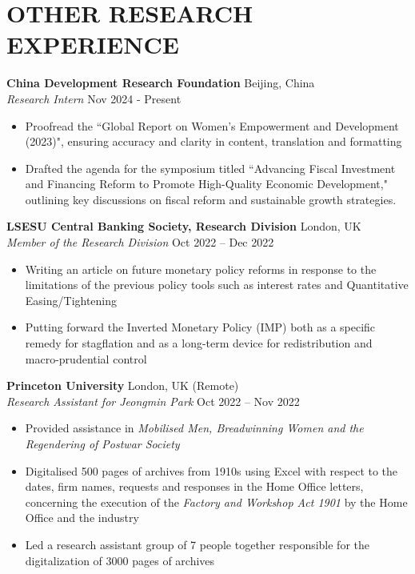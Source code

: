\documentclass[a4paper,9pt]{extarticle}
\begin{document}
\section*{OTHER RESEARCH EXPERIENCE}
\noindent
\textbf{China Development Research Foundation} \hfill Beijing, China \\
\textit{Research Intern} \hfill Nov 2024 - Present
\begin{itemize}
    \item Proofread the ``Global Report on Women's Empowerment and Development (2023)", ensuring accuracy and clarity in content, translation and formatting
    \item Drafted the agenda for the symposium titled ``Advancing Fiscal Investment and Financing Reform to Promote High-Quality Economic Development," outlining key discussions on fiscal reform and sustainable growth strategies.
\end{itemize}
\noindent
\textbf{LSESU Central Banking Society, Research Division} \hfill London, UK\\ %
\textit{Member of the Research Division} \hfill Oct 2022 – Dec 2022 %
\begin{itemize}
    \item Writing an article on future monetary policy reforms in response to the limitations of the previous policy tools such as interest rates and Quantitative Easing/Tightening
    \item Putting forward the Inverted Monetary Policy (IMP) both as a specific remedy for stagflation and as a long-term device  for redistribution and macro-prudential control
\end{itemize}
\noindent
\textbf{Princeton University} \hfill London, UK (Remote) \\
\textit{Research Assistant for Jeongmin Park} \hfill Oct 2022 – Nov 2022 %
\begin{itemize}
    \item Provided assistance in \textit{Mobilised Men, Breadwinning Women and the Regendering of Postwar Society}
    \item Digitalised 500 pages of archives from 1910s using Excel with respect to the dates, firm names, requests and responses in the Home Office letters, concerning the execution of the \textit{Factory and Workshop Act 1901} by the Home Office and the industry
    \item Led a research assistant group of 7 people together responsible for the digitalization of 3000 pages of archives
\end{itemize}
\end{document}
